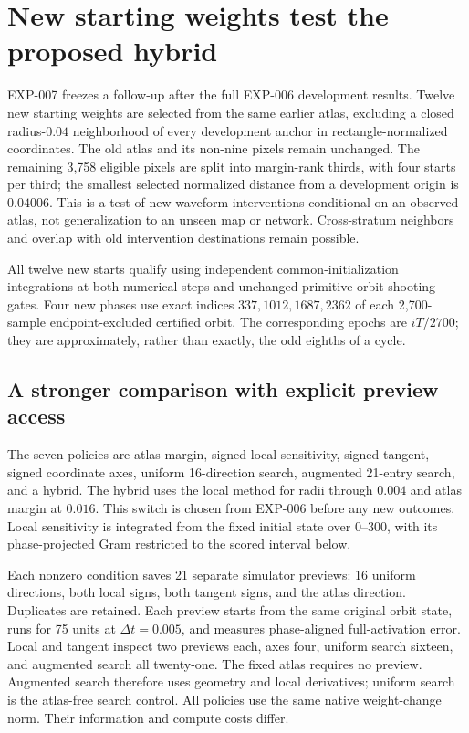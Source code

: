 \section{New starting weights test the proposed hybrid}
EXP-007 freezes a follow-up after the full EXP-006 development results. Twelve new starting weights are selected from the same earlier atlas, excluding a closed radius-$0.04$ neighborhood of every development anchor in rectangle-normalized coordinates. The old atlas and its non-nine pixels remain unchanged. The remaining 3,758 eligible pixels are split into margin-rank thirds, with four starts per third; the smallest selected normalized distance from a development origin is $0.04006$. This is a test of new waveform interventions conditional on an observed atlas, not generalization to an unseen map or network. Cross-stratum neighbors and overlap with old intervention destinations remain possible.

All twelve new starts qualify using independent common-initialization integrations at both numerical steps and unchanged primitive-orbit shooting gates. Four new phases use exact indices $337,1012,1687,2362$ of each 2,700-sample endpoint-excluded certified orbit. The corresponding epochs are $iT/2700$; they are approximately, rather than exactly, the odd eighths of a cycle.

\subsection{A stronger comparison with explicit preview access}
The seven policies are atlas margin, signed local sensitivity, signed tangent, signed coordinate axes, uniform 16-direction search, augmented 21-entry search, and a hybrid. The hybrid uses the local method for radii through $0.004$ and atlas margin at $0.016$. This switch is chosen from EXP-006 before any new outcomes. Local sensitivity is integrated from the fixed initial state over $0$--$300$, with its phase-projected Gram restricted to the scored interval below.

Each nonzero condition saves 21 separate simulator previews: 16 uniform directions, both local signs, both tangent signs, and the atlas direction. Duplicates are retained. Each preview starts from the same original orbit state, runs for 75 units at $\Delta t=0.005$, and measures phase-aligned full-activation error. Local and tangent inspect two previews each, axes four, uniform search sixteen, and augmented search all twenty-one. The fixed atlas requires no preview. Augmented search therefore uses geometry and local derivatives; uniform search is the atlas-free search control. All policies use the same native weight-change norm. Their information and compute costs differ.

